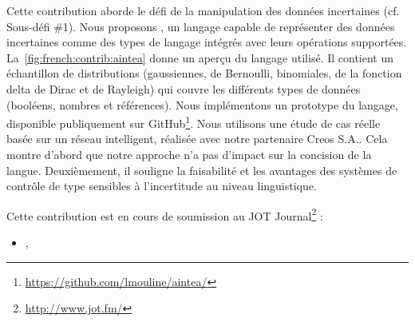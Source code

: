 %
Cette contribution aborde le défi de la manipulation des données incertaines (cf. Sous-défi \#1). 
Nous proposons \langName{}, un langage capable de représenter des données incertaines comme des types de langage intégrés avec leurs opérations supportées. 
La~\cref{fig:french:contrib:aintea} donne un aperçu du langage utilisé. Il contient un échantillon de distributions (gaussiennes, de Bernoulli, binomiales, de la fonction delta de Dirac et de Rayleigh) qui couvre les différents types de données (booléens, nombres et références). 
Nous implémentons un prototype du langage, disponible publiquement sur GitHub\footnote{\url{https://github.com/lmouline/aintea/}}. 
Nous utilisons une étude de cas réelle basée sur un réseau intelligent, réalisée avec notre partenaire Creos S.A.. 
Cela montre d'abord que notre approche n'a pas d'impact sur la concision de la langue. 
Deuxièmement, il souligne la faisabilité et les avantages des systèmes de contrôle de type sensibles à l'incertitude au niveau linguistique.

%
Cette contribution est en cours de soumission au JOT Journal\footnote{\url{http://www.jot.fm/}} :
\begin{itemize}
	\item {}, \citeauthor{insubmission:2019:comlan:datauncertainty}
\end{itemize}


